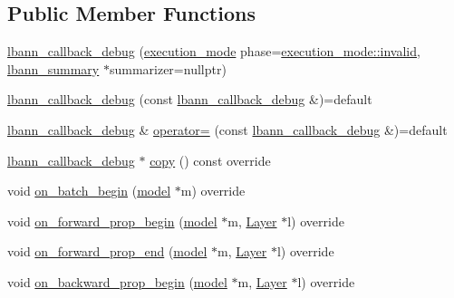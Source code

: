 \subsection*{Public Member Functions}
\begin{DoxyCompactItemize}
\item 
\hyperlink{classlbann_1_1lbann__callback__debug_a775f2f407573526795a9b7ffc7bd3ded}{lbann\+\_\+callback\+\_\+debug} (\hyperlink{base_8hpp_a2781a159088df64ed7d47cc91c4dc0a8}{execution\+\_\+mode} phase=\hyperlink{base_8hpp_a2781a159088df64ed7d47cc91c4dc0a8afedb2d84cafe20862cb4399751a8a7e3}{execution\+\_\+mode\+::invalid}, \hyperlink{classlbann_1_1lbann__summary}{lbann\+\_\+summary} $\ast$summarizer=nullptr)
\item 
\hyperlink{classlbann_1_1lbann__callback__debug_a124703602aab20bcfabfca697e3a9ff1}{lbann\+\_\+callback\+\_\+debug} (const \hyperlink{classlbann_1_1lbann__callback__debug}{lbann\+\_\+callback\+\_\+debug} \&)=default
\item 
\hyperlink{classlbann_1_1lbann__callback__debug}{lbann\+\_\+callback\+\_\+debug} \& \hyperlink{classlbann_1_1lbann__callback__debug_ad30a57ba6ec0b7e479345647651a8e83}{operator=} (const \hyperlink{classlbann_1_1lbann__callback__debug}{lbann\+\_\+callback\+\_\+debug} \&)=default
\item 
\hyperlink{classlbann_1_1lbann__callback__debug}{lbann\+\_\+callback\+\_\+debug} $\ast$ \hyperlink{classlbann_1_1lbann__callback__debug_a76ffcfb7aca5ccce132ceae60e267472}{copy} () const override
\item 
void \hyperlink{classlbann_1_1lbann__callback__debug_abab8f3b9c1db3d0ef3a715afc7b880db}{on\+\_\+batch\+\_\+begin} (\hyperlink{classlbann_1_1model}{model} $\ast$m) override
\item 
void \hyperlink{classlbann_1_1lbann__callback__debug_ac3e88ef582a7e3949b6e016ca2b17459}{on\+\_\+forward\+\_\+prop\+\_\+begin} (\hyperlink{classlbann_1_1model}{model} $\ast$m, \hyperlink{classlbann_1_1Layer}{Layer} $\ast$l) override
\item 
void \hyperlink{classlbann_1_1lbann__callback__debug_acb3d05be6c600f4d61957ccf10606ddc}{on\+\_\+forward\+\_\+prop\+\_\+end} (\hyperlink{classlbann_1_1model}{model} $\ast$m, \hyperlink{classlbann_1_1Layer}{Layer} $\ast$l) override
\item 
void \hyperlink{classlbann_1_1lbann__callback__debug_adaf60c995d2638a40d9c87a923c53865}{on\+\_\+backward\+\_\+prop\+\_\+begin} (\hyperlink{classlbann_1_1model}{model} $\ast$m, \hyperlink{classlbann_1_1Layer}{Layer} $\ast$l) override

\end{DoxyCompactItemize}
